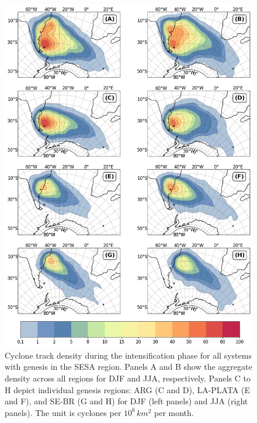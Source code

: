 \begin{figure}[!htbp]
\centering
\includegraphics[width=\textwidth]{figs_4/density_map_intensification.png}
\caption[Track Density - Intensification Phase]{Cyclone track density during the intensification phase for all systems with genesis in the SESA region. Panels A and B show the aggregate density across all regions for DJF and JJA, respectively. Panels C to H depict individual genesis regions: ARG (C and D), LA-PLATA (E and F), and SE-BR (G and H) for DJF (left panels) and JJA (right panels). The unit is cyclones per \(10^6 \, km^2\) per month.}
\label{fig:density_map_intensification}
\end{figure}

